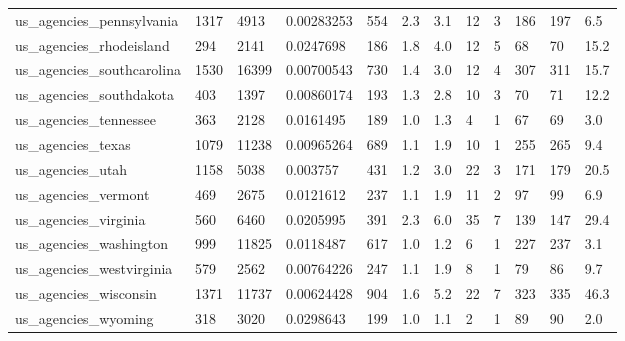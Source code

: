 \begin{longtable}{llllllllllll}
 us\_agencies\_pennsylvania                           & 1317       & 4913      & 0.00283253  & 554   & 2.3    & 3.1    & 12    & 3      & 186    & 197    & 6.5     \\
 us\_agencies\_rhodeisland                            & 294        & 2141      & 0.0247698   & 186   & 1.8    & 4.0    & 12    & 5      & 68     & 70     & 15.2    \\
 us\_agencies\_southcarolina                          & 1530       & 16399     & 0.00700543  & 730   & 1.4    & 3.0    & 12    & 4      & 307    & 311    & 15.7    \\
 us\_agencies\_southdakota                            & 403        & 1397      & 0.00860174  & 193   & 1.3    & 2.8    & 10    & 3      & 70     & 71     & 12.2    \\
 us\_agencies\_tennessee                              & 363        & 2128      & 0.0161495   & 189   & 1.0    & 1.3    & 4     & 1      & 67     & 69     & 3.0     \\
 us\_agencies\_texas                                  & 1079       & 11238     & 0.00965264  & 689   & 1.1    & 1.9    & 10    & 1      & 255    & 265    & 9.4     \\
 us\_agencies\_utah                                   & 1158       & 5038      & 0.003757    & 431   & 1.2    & 3.0    & 22    & 3      & 171    & 179    & 20.5    \\
 us\_agencies\_vermont                                & 469        & 2675      & 0.0121612   & 237   & 1.1    & 1.9    & 11    & 2      & 97     & 99     & 6.9     \\
 us\_agencies\_virginia                               & 560        & 6460      & 0.0205995   & 391   & 2.3    & 6.0    & 35    & 7      & 139    & 147    & 29.4    \\
 us\_agencies\_washington                             & 999        & 11825     & 0.0118487   & 617   & 1.0    & 1.2    & 6     & 1      & 227    & 237    & 3.1     \\
 us\_agencies\_westvirginia                           & 579        & 2562      & 0.00764226  & 247   & 1.1    & 1.9    & 8     & 1      & 79     & 86     & 9.7     \\
 us\_agencies\_wisconsin                              & 1371       & 11737     & 0.00624428  & 904   & 1.6    & 5.2    & 22    & 7      & 323    & 335    & 46.3    \\
 us\_agencies\_wyoming                                & 318        & 3020      & 0.0298643   & 199   & 1.0    & 1.1    & 2     & 1      & 89     & 90     & 2.0     \\

\end{longtable}
